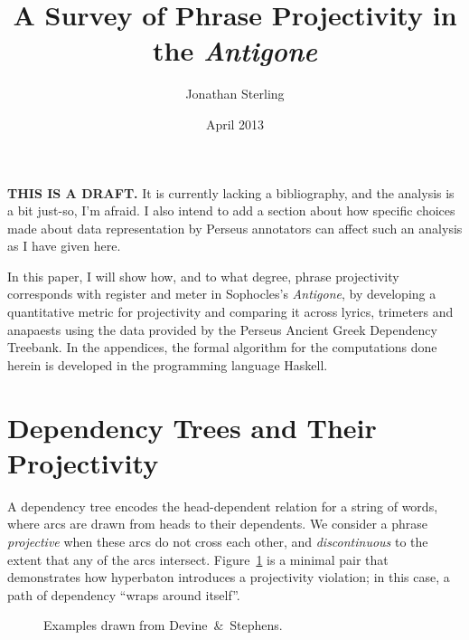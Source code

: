 \documentclass{article}
\begin{document}
\onehalfspacing
\setmainfont{Adobe Text Pro}

\author{Jonathan Sterling}

\title{A Survey of Phrase Projectivity in the \emph{Antigone}}
\date{April 2013}
\maketitle


\noindent \textbf{THIS IS A DRAFT.} It is currently lacking a bibliography, and
the analysis is a bit just-so, I'm afraid. I also intend to add a section about
how specific choices made about data representation by Perseus annotators can
affect such an analysis as I have given here.

In this paper, I will show how, and to what degree, phrase projectivity
corresponds with register and meter in Sophocles's \emph{Antigone}, by
developing a quantitative metric for projectivity and comparing it across
lyrics, trimeters and anapaests using the data provided by the Perseus Ancient
Greek Dependency Treebank. In the appendices, the formal algorithm for the
computations done herein is developed in the programming language Haskell.

\section{Dependency Trees and Their Projectivity}

A dependency tree encodes the head-dependent relation for a string of words,
where arcs are drawn from heads to their dependents. We consider a phrase
\emph{projective} when these arcs do not cross each other, and
\emph{discontinuous} to the extent that any of the arcs intersect.
Figure~\ref{fig:dependency-trees1} is a minimal pair that demonstrates how
hyperbaton introduces a projectivity violation; in this case, a path of
dependency ``wraps around itself''.

\begin{figure}[h!]
\centering
{}
\hspace{6pt}

\caption{Examples drawn from Devine~\&~Stephens.}
\label{fig:dependency-trees1}
\end{figure}
\end{document}
